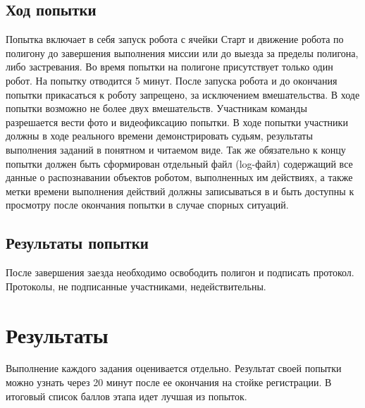 \documentclass[12pt]{article}
\begin{document}
\subsection{Ход попытки} \hspace*{1cm}
Попытка включает в себя запуск робота с ячейки Старт и движение робота по полигону до завершения выполнения миссии или до выезда за пределы полигона, либо застревания. Во время попытки на полигоне присутствует только один робот. На попытку отводится 5 минут. После запуска робота и до окончания попытки прикасаться к роботу запрещено, за исключением вмешательства. В ходе попытки возможно не более двух вмешательств.  Участникам команды разрешается вести фото и видеофиксацию попытки. В ходе попытки участники должны в ходе реального времени демонстрировать судьям, результаты выполнения заданий в понятном и читаемом виде. Так же обязательно к концу попытки должен быть сформирован отдельный файл (log-файл) содержащий все данные о распознавании объектов роботом, выполненных им действиях, а также метки времени выполнения действий должны записываться в и быть доступны к просмотру после окончания попытки в случае спорных ситуаций.

\subsection{Результаты попытки} \hspace*{1cm}
После завершения заезда необходимо освободить полигон и подписать протокол.  Протоколы, не подписанные участниками, недействительны.

\section{Результаты} \hspace*{1cm}
Выполнение каждого задания оценивается отдельно. Результат своей попытки можно узнать через 20 минут после ее окончания на стойке регистрации. В итоговый список баллов этапа идет лучшая из попыток.

\end{document}
